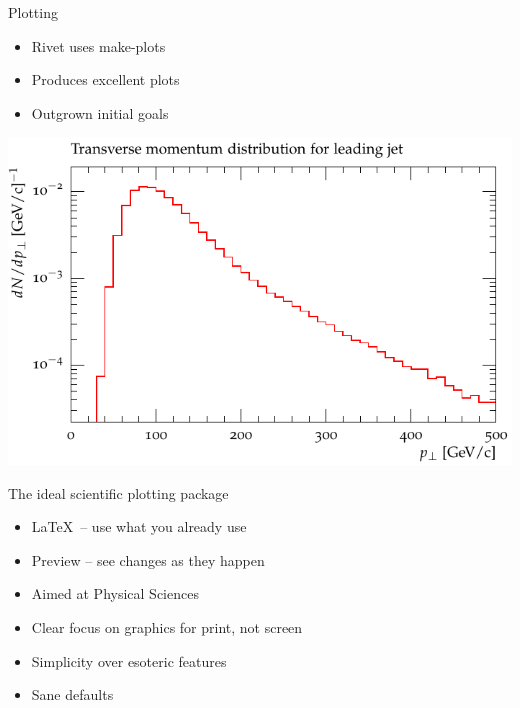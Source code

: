 \documentclass{beamer}
\begin{document}
  \begin{frame}{Plotting}
    \begin{itemize}
      \item Rivet uses make-plots
      \item Produces excellent plots
      \item Outgrown initial goals
    \end{itemize}
  \end{frame}
  \begin{frame}
    \includegraphics[width=\textwidth]{makeplots}
  \end{frame}

  \begin{frame}{The ideal scientific plotting package}
    \begin{itemize}
      \item \LaTeX\ -- use what you already use
      \item Preview -- see changes as they happen
      \item Aimed at Physical Sciences
      \item Clear focus on graphics for print, not screen
      \item Simplicity over esoteric features
      \item Sane defaults
    \end{itemize}
  \end{frame}
\end{document}
